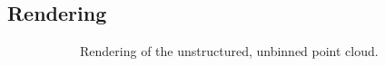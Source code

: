 \subsection{Rendering} \label{constributions:user:rendering}
\begin{figure}
\centering
\begin{subfigure}[b]{0.21\textwidth}
    \caption{Rendering of the unstructured, unbinned point cloud.}
    \label{contributions:usar:rendering:points}
\end{subfigure}
\hspace*{2.5mm}
\begin{subfigure}[b]{0.21\textwidth}

\end{subfigure}
\end{figure}

